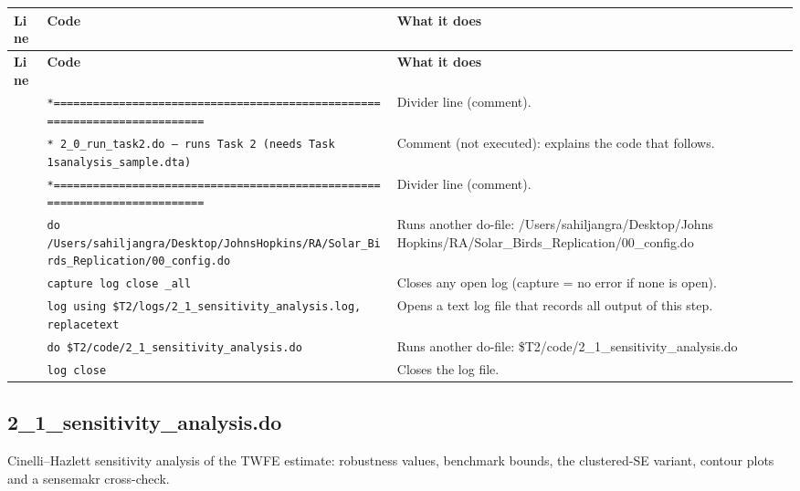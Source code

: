 \documentclass[10pt]{article}
\newcommand{\codetable}[1]{%
{\footnotesize
\begin{longtable}{>{\raggedleft\arraybackslash}p{0.55cm}>{\raggedright\arraybackslash}p{8.3cm}>{\raggedright\arraybackslash}p{8.0cm}}
\toprule \textbf{Line} & \textbf{Code} & \textbf{What it does}\\ \midrule \endfirsthead
\toprule \textbf{Line} & \textbf{Code} & \textbf{What it does}\\ \midrule \endhead
\bottomrule \endfoot
#1
\end{longtable}}}
\begin{document}
\codetable{1 & \texttt{*=========================================================\newline \hspace*{1em}=================} & Divider line (comment).\\
2 & \texttt{* 2\_0\_run\_task2.do  —  runs Task 2 (needs Task 1\textquotesingle{}s\newline \hspace*{1em}analysis\_sample.dta)} & Comment (not executed): explains the code that follows.\\
3 & \texttt{*=========================================================\newline \hspace*{1em}=================} & Divider line (comment).\\
4 & \texttt{do \textquotedbl{}/Users/sahiljangra/Desktop/Johns\newline \hspace*{1em}Hopkins/RA/Solar\_Birds\_Replication/00\_config.do\textquotedbl{}} & Runs another do-file: /Users/sahiljangra/Desktop/Johns Hopkins/RA/Solar\_Birds\_Replication/00\_config.do\\
5 & \texttt{capture log close \_all} & Closes any open log (capture = no error if none is open).\\
6 & \texttt{log using \textquotedbl{}\$T2/logs/2\_1\_sensitivity\_analysis.log\textquotedbl{}, replace\newline \hspace*{1em}text} & Opens a text log file that records all output of this step.\\
7 & \texttt{do \textquotedbl{}\$T2/code/2\_1\_sensitivity\_analysis.do\textquotedbl{}} & Runs another do-file: \$T2/code/2\_1\_sensitivity\_analysis.do\\
8 & \texttt{log close} & Closes the log file.\\}
\subsection{2\_1\_sensitivity\_analysis.do}
Cinelli--Hazlett sensitivity analysis of the TWFE estimate: robustness values, benchmark bounds, the clustered-SE variant, contour plots and a sensemakr cross-check.
\end{document}
